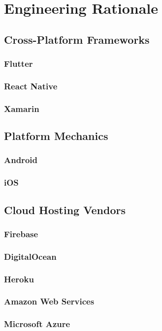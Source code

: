\chapter{Engineering Rationale}

\section{Cross-Platform Frameworks}

\subsection{Flutter}

\subsection{React Native}

\subsection{Xamarin}

\section{Platform Mechanics}

\subsection{Android}

\subsection{iOS}

\section{Cloud Hosting Vendors}

\subsection{Firebase}

\subsection{DigitalOcean}

\subsection{Heroku}

\subsection{Amazon Web Services}

\subsection{Microsoft Azure}